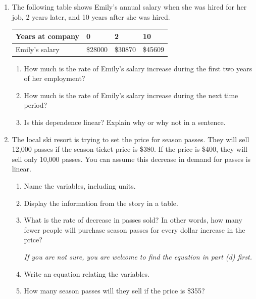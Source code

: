 \documentclass[12pt]{article}
\begin{document}
\begin{enumerate}

\item The following table shows Emily's annual salary when she was hired for her job, 2 years later, and 10 years after she was hired.

\begin{center}
\begin{tabular} {|l||l|l|l|} \hline
Years at company & 0 & 2 & 10  \\ \hline
Emily's salary & \$28000 & \$30870 & \$45609 \\ \hline
\end{tabular}
\end{center}

\begin{enumerate}
\item How much is the rate of Emily's salary increase during the first two years of her employment?
\vfill
\item How much is the rate of Emily's salary increase during the next time period?
\vfill
\item Is this dependence linear? Explain why or why not in a sentence.
\vfill
\end{enumerate}

\newpage %

\item The local ski resort is trying to set the price for season passes.  They will sell 12,000 passes if the season ticket price is \$380.  If the price is \$400, they will sell only 10,000 passes.  You can assume this decrease in demand for passes is linear.

\begin{enumerate}
\item Name the variables, including units.
\vfill
\item Display the information from the story in a table.
\vfill
\item What is the rate of decrease in passes sold?  In other words, how many fewer people will purchase season passes for every dollar increase in the price?

\emph{If you are not sure, you are welcome to find the equation in part (d) first.}
\vfill
\item Write an equation relating the variables.
\vfill
\item How many season passes will they sell if the price is \$355?
\vfill
\end{enumerate}


\end{enumerate}
\end{document}
